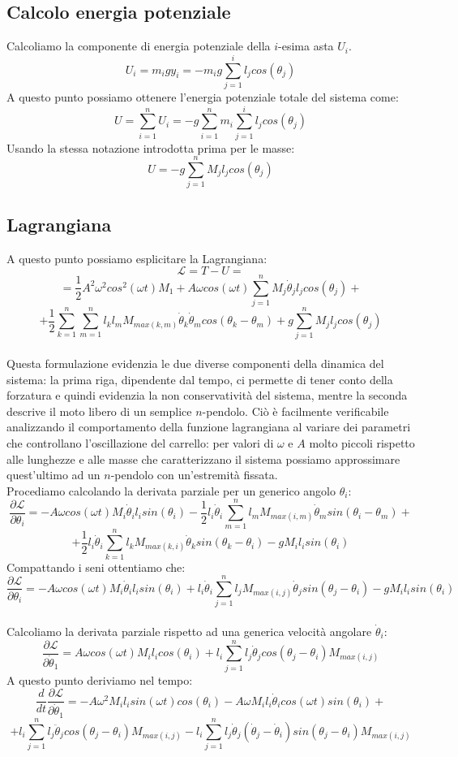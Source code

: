 \documentclass[12pt, a4paper] {article}
\begin{document}
\subsection{Calcolo energia potenziale}
Calcoliamo la componente di energia potenziale della $i$-esima asta $U_i$.
\[U_i=m_igy_i=-m_ig\sum_{j=1}^{i}l_jcos(\theta_j)\]
A questo punto possiamo ottenere l'energia potenziale totale del sistema come:
\[U=\sum_{i=1}^{n}U_i=-g\sum_{i=1}^{n}m_i\sum_{j=1}^{i}l_jcos(\theta_j)\]
Usando la stessa notazione introdotta prima per le masse:
\[U=-g\sum_{j=1}^{n}M_jl_jcos(\theta_j)\]
\subsection{Lagrangiana}
A questo punto possiamo esplicitare la Lagrangiana: \[\mathcal{L}=T-U=\]\[=\frac{1}{2}A^2\omega^2cos^2(\omega t)M_1+A\omega cos(\omega t)\sum_{j=1}^{n}M_j\dot\theta_jl_jcos(\theta_j)+\]
\[+\frac{1}{2}\sum_{k=1}^{n}\sum_{m=1}^{n}l_kl_m M_{max(k,m)}\dot\theta_k \dot\theta_m cos(\theta_k-\theta_m)+g\sum_{j=1}^{n}M_jl_jcos(\theta_j)\]
\\Questa formulazione evidenzia le due diverse componenti della dinamica del sistema: la prima riga, dipendente dal tempo, ci permette di tener conto della forzatura e quindi evidenzia la non conservatività del sistema, mentre la seconda descrive il moto libero di un semplice $n$-pendolo. Ciò è facilmente verificabile analizzando il comportamento della funzione lagrangiana al variare dei parametri che controllano l'oscillazione del carrello: per valori di $\omega$ e $A$ molto piccoli rispetto alle lunghezze e alle masse che caratterizzano il sistema possiamo approssimare quest'ultimo ad un $n$-pendolo con un'estremità fissata.     
\\Procediamo calcolando la derivata parziale per un generico angolo $\theta_i$:
\[\frac{\partial \mathcal{L}}{\partial \theta_i}=-A\omega cos(\omega t)M_i\dot\theta_il_i sin(\theta_i)-\frac{1}{2}l_i\dot\theta_i\sum_{m=1}^{n}l_m M_{max(i,m)}\dot\theta_m sin(\theta_i-\theta_m)+\]
\[+\frac{1}{2}l_i\dot\theta_i\sum_{k=1}^{n}l_k M_{max(k,i)}\dot\theta_k sin(\theta_k-\theta_i)-g M_i l_i sin(\theta_i)\]
Compattando i seni ottentiamo che:
\[\frac{\partial \mathcal{L}}{\partial \theta_i}=-A\omega cos(\omega t)M_i\dot\theta_il_i sin(\theta_i)+l_i\dot\theta_i\sum_{j=1}^{n}l_j M_{max(i,j)}\dot\theta_j sin(\theta_j-\theta_i)-g M_i l_i sin(\theta_i)\]
\\Calcoliamo la derivata parziale rispetto ad una generica velocità angolare $\dot\theta_i$:
\[\frac{\partial \mathcal{L}}{\partial \dot\theta_1}=A\omega cos(\omega t) M_i l_i cos (\theta_i) + l_i \sum_{j=1}^{n}l_j\dot\theta_jcos(\theta_j-\theta_i)M_{max(i,j)}\]
A questo punto deriviamo nel tempo:
\[\frac{d}{dt}\frac{\partial \mathcal{L}}{\partial \dot\theta_1}=-A\omega^2M_il_isin(\omega t)cos(\theta_i)-A\omega M_il_i\dot\theta_icos(\omega t)sin(\theta_i)+\]\[+l_i\sum_{j=1}^{n}l_j\ddot\theta_jcos(\theta_j-\theta_i)M_{max(i,j)}-l_i\sum_{j=1}^{n}l_j\dot\theta_j(\dot\theta_j-\dot\theta_i)sin(\theta_j-\theta_i)M_{max(i,j)}\]
\end{document}
